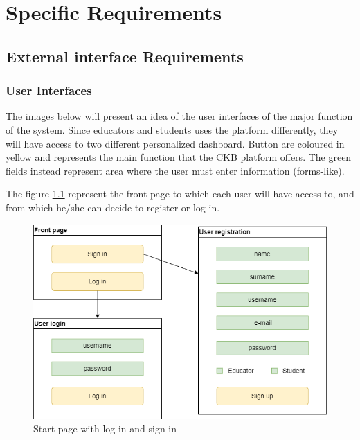 \chapter{Specific Requirements}

\section{External interface Requirements}
\subsection{User Interfaces}
The images below will present an idea of the user interfaces of the major function of the system. Since educators and students uses the platform differently, they will have access to two different personalized dashboard. \newline
Button are coloured in yellow and represents the main function that the CKB platform offers. The green fields instead represent area where the user must enter information (forms-like). \newline

The figure \ref{fig:login-signin} represent the front page to which each user will have access to, and from which he/she can decide to register or log in. 
    
\begin{figure}[H]
    \centering
    \includegraphics[scale=0.5]{images/login-signin.png}
    \caption{Start page with log in and sign in}
    \label{fig:login-signin}
\end{figure}

